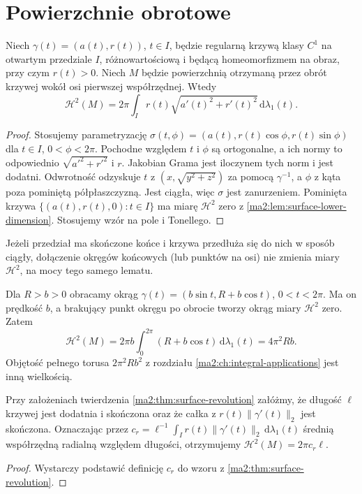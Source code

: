 \section{Powierzchnie obrotowe}

\begin{twierdzenie}
\label{ma2:thm:surface-revolution}
Niech $\gamma(t)=(a(t),r(t))$, $t\in I$,
będzie regularną krzywą klasy $C^1$ na otwartym
przedziale $I$, różnowartościową i będącą
homeomorfizmem na obraz, przy czym $r(t)>0$.
Niech $M$ będzie powierzchnią otrzymaną przez obrót
krzywej wokół osi pierwszej współrzędnej. Wtedy
\[
 \mathcal H^2(M)=2\pi\int_I r(t)
 \sqrt{a'(t)^2+r'(t)^2}\,\mathrm d\lambda_1(t).
\]
\end{twierdzenie}
\begin{proof}
Stosujemy parametryzację
$\sigma(t,\phi)=(a(t),r(t)\cos\phi,r(t)\sin\phi)$
dla $t\in I$, $0<\phi<2\pi$.
Pochodne względem $t$ i $\phi$ są ortogonalne,
a ich normy to odpowiednio
$\sqrt{a'^2+r'^2}$ i $r$. Jakobian Grama jest
iloczynem tych norm i jest dodatni.
Odwrotność odzyskuje $t$ z $(x,\sqrt{y^2+z^2})$
za pomocą $\gamma^{-1}$, a $\phi$ z kąta poza
pominiętą półpłaszczyzną. Jest ciągła, więc
$\sigma$ jest zanurzeniem. Pominięta krzywa
$\{(a(t),r(t),0):t\in I\}$ ma miarę $\mathcal H^2$
zero z \ref{ma2:lem:surface-lower-dimension}.
Stosujemy wzór na pole i Tonellego.
\end{proof}
Jeżeli przedział ma skończone końce i krzywa
przedłuża się do nich w sposób ciągły, dołączenie
okręgów końcowych (lub punktów na osi) nie zmienia
miary $\mathcal H^2$, na mocy tego samego lematu.

\begin{przyklad}
\label{ma2:ex:surface-torus}
Dla $R>b>0$ obracamy okrąg
$\gamma(t)=(b\sin t,R+b\cos t)$, $0<t<2\pi$.
Ma on prędkość $b$, a brakujący punkt okręgu
po obrocie tworzy okrąg miary $\mathcal H^2$ zero.
Zatem
\[
 \mathcal H^2(M)=2\pi b\int_0^{2\pi}(R+b\cos t)
 \,\mathrm d\lambda_1(t)=4\pi^2Rb.
\]
Objętość pełnego torusa $2\pi^2Rb^2$ z rozdziału
\ref{ma2:ch:integral-applications} jest inną wielkością.
\end{przyklad}

\begin{wniosek}
\label{ma2:cor:surface-pappus}
Przy założeniach twierdzenia \ref{ma2:thm:surface-revolution}
załóżmy, że długość $\ell$ krzywej jest dodatnia
i skończona oraz że całka z $r(t)\|\gamma'(t)\|_2$
jest skończona. Oznaczając przez
$c_r=\ell^{-1}\int_I r(t)\|\gamma'(t)\|_2\,\mathrm d\lambda_1(t)$
średnią współrzędną radialną względem długości,
otrzymujemy $\mathcal H^2(M)=2\pi c_r\ell$.
\end{wniosek}
\begin{proof}
Wystarczy podstawić definicję $c_r$ do wzoru
z \ref{ma2:thm:surface-revolution}.
\end{proof}

